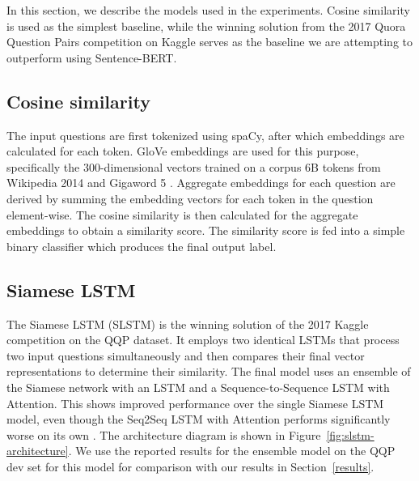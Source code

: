 \documentclass[10pt, a4paper]{article}
\begin{document}
In this section, we describe the models used in the experiments.
Cosine similarity is used as the simplest baseline, while the winning solution from the 2017 Quora Question Pairs competition on Kaggle serves as the baseline we are attempting to outperform using Sentence-BERT.

\subsection{Cosine similarity} \label{cosine-similarity}

The input questions are first tokenized using spaCy, after which embeddings are calculated for each token.
GloVe embeddings are used for this purpose, specifically the 300-dimensional vectors trained on a corpus 6B tokens from Wikipedia 2014 and Gigaword 5 \citep{pennington2014glove}.
Aggregate embeddings for each question are derived by summing the embedding vectors for each token in the question element-wise.
The cosine similarity is then calculated for the aggregate embeddings to obtain a similarity score.
The similarity score is fed into a simple binary classifier which produces the final output label.

\subsection{Siamese LSTM} \label{siamese-lstm}

The Siamese LSTM (SLSTM) is the winning solution of the 2017 Kaggle competition on the QQP dataset.
It employs two identical LSTMs that process two input questions simultaneously and then compares their final vector representations to determine their similarity.
The final model uses an ensemble of the Siamese network with an LSTM and a Sequence-to-Sequence LSTM with Attention.
This shows improved performance over the single Siamese LSTM model, even though the Seq2Seq LSTM with Attention performs significantly worse on its own \citep{dadashov2017quora}.
The architecture diagram is shown in Figure~\ref{fig:slstm-architecture}.
We use the reported results for the ensemble model on the QQP dev set for this model for comparison with our results in Section~\ref{results}.

\end{document}
